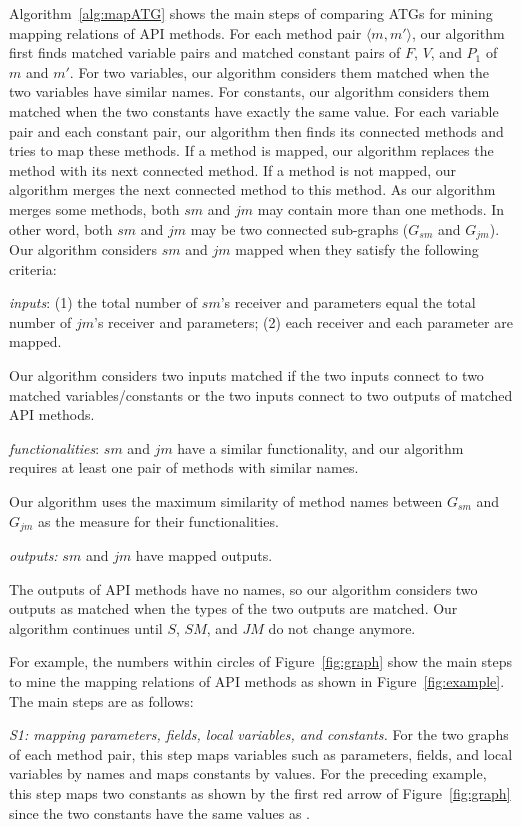 Algorithm~\ref{alg:mapATG} shows the main steps of comparing ATGs
for mining mapping relations of API methods. For each method pair
$\langle m, m'\rangle$, our algorithm first finds matched variable
pairs and matched constant pairs of $F$, $V$, and $P_1$ of $m$ and
$m'$. For two variables, our algorithm considers them matched when
the two variables have similar names. For constants, our algorithm
considers them matched when the two constants have exactly the same
value. For each variable pair and each constant pair, our algorithm
then finds its connected methods and tries to map these methods. If
a method is mapped, our algorithm replaces the method with its next
connected method. If a method is not mapped, our algorithm merges
the next connected method to this method. As our algorithm merges
some methods, both $sm$ and $jm$ may contain more than one methods.
In other word, both $sm$ and $jm$ may be two connected sub-graphs
($G_{sm}$ and $G_{jm}$). Our algorithm considers $sm$ and $jm$
mapped when they satisfy the following criteria:

\emph{inputs}: (1) the total number of $sm$'s receiver and
parameters equal the total number of $jm$'s receiver and parameters;
(2) each receiver and each parameter are mapped.

Our algorithm considers two inputs matched if the two inputs connect
to two matched variables/constants or the two inputs connect to two
outputs of matched API methods.

\emph{functionalities}: $sm$ and $jm$ have a similar functionality,
and our algorithm requires at least one pair of methods with similar
names.

Our algorithm uses the maximum similarity of method names between
$G_{sm}$ and $G_{jm}$ as the measure for their functionalities.

\emph{outputs:} $sm$ and $jm$ have mapped outputs.


The outputs of API methods have no names, so our algorithm considers
two outputs as matched when the types of the two outputs are
matched. Our algorithm continues until $S$, $SM$, and $JM$ do not
change anymore.

For example, the numbers within circles of Figure~\ref{fig:graph}
show the main steps to mine the mapping relations of API methods as
shown in Figure~\ref{fig:example}. The main steps are as follows:

\emph{S1: mapping parameters, fields, local variables, and
constants.} For the two graphs of each method pair, this step maps
variables such as parameters, fields, and local variables by names
and maps constants by values. For the preceding example, this step
maps two constants as shown by the first red arrow of
Figure~\ref{fig:graph} since the two constants have the same values
as .

